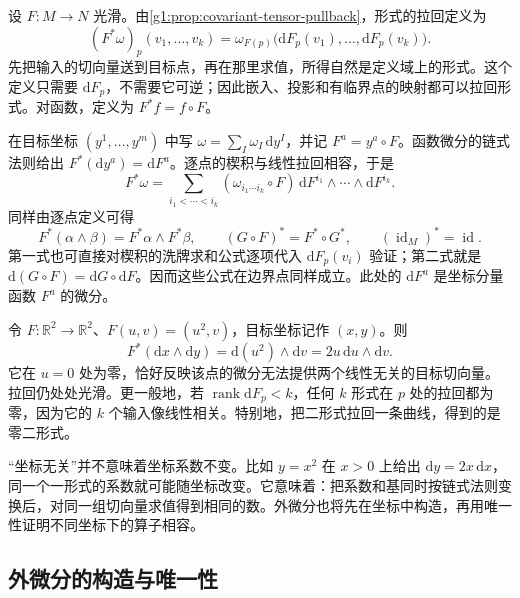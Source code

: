\ProseParagraphBreak

设 \(F:M\to N\) 光滑。由\cref{g1:prop:covariant-tensor-pullback}，形式的拉回定义为
\[
	(F^*\omega)_p(v_1,\ldots,v_k)
	=\omega_{F(p)}\bigl(\mathrm{d}F_p(v_1),\ldots,\mathrm{d}F_p(v_k)\bigr).
\]
先把输入的切向量送到目标点，再在那里求值，所得自然是定义域上的形式。这个定义只需要 \(\mathrm{d}F_p\)，不需要它可逆；因此嵌入、投影和有临界点的映射都可以拉回形式。对函数，定义为 \(F^*f=f\circ F\)。

\ProseParagraphBreak

在目标坐标 \((y^1,\ldots,y^m)\) 中写 \(\omega=\sum_I\omega_I\,\mathrm{d}y^I\)，并记 \(F^a=y^a\circ F\)。函数微分的链式法则给出 \(F^*(\mathrm{d}y^a)=\mathrm{d}F^a\)。逐点的楔积与线性拉回相容，于是
\begin{equation}
	\label{g1:eq:form-pullback-coordinates}
	F^*\omega=\sum_{i_1<\cdots<i_k}(\omega_{i_1\cdots i_k}\circ F)\,\mathrm{d}F^{i_1}\wedge\cdots\wedge\mathrm{d}F^{i_k}.
\end{equation}
同样由逐点定义可得
\[
	F^*(\alpha\wedge\beta)=F^*\alpha\wedge F^*\beta,\qquad
	(G\circ F)^*=F^*\circ G^*,\qquad (\operatorname{id}_M)^*=\operatorname{id}.
\]
第一式也可直接对楔积的洗牌求和公式逐项代入 \(\mathrm{d}F_p(v_i)\) 验证；第二式就是 \(\mathrm{d}(G\circ F)=\mathrm{d}G\circ\mathrm{d}F\)。因而这些公式在边界点同样成立。此处的 \(\mathrm{d}F^a\) 是坐标分量函数 \(F^a\) 的微分。

\begin{example}
	令 \(F:\mathbb R^2\to\mathbb R^2\)、\(F(u,v)=(u^2,v)\)，目标坐标记作 \((x,y)\)。则
	\[
		F^*(\mathrm{d}x\wedge\mathrm{d}y)=\mathrm{d}(u^2)\wedge\mathrm{d}v=2u\,\mathrm{d}u\wedge\mathrm{d}v.
	\]
	它在 \(u=0\) 处为零，恰好反映该点的微分无法提供两个线性无关的目标切向量。拉回仍处处光滑。更一般地，若 \(\operatorname{rank}\mathrm{d}F_p<k\)，任何 \(k\) 形式在 \(p\) 处的拉回都为零，因为它的 \(k\) 个输入像线性相关。特别地，把二形式拉回一条曲线，得到的是零二形式。
\end{example}

“坐标无关”并不意味着坐标系数不变。比如 \(y=x^2\) 在 \(x>0\) 上给出 \(\mathrm{d}y=2x\,\mathrm{d}x\)，同一个一形式的系数就可能随坐标改变。它意味着：把系数和基同时按链式法则变换后，对同一组切向量求值得到相同的数。外微分也将先在坐标中构造，再用唯一性证明不同坐标下的算子相容。

\subsection{外微分的构造与唯一性}
\label{g1:subsec:1401:02}

